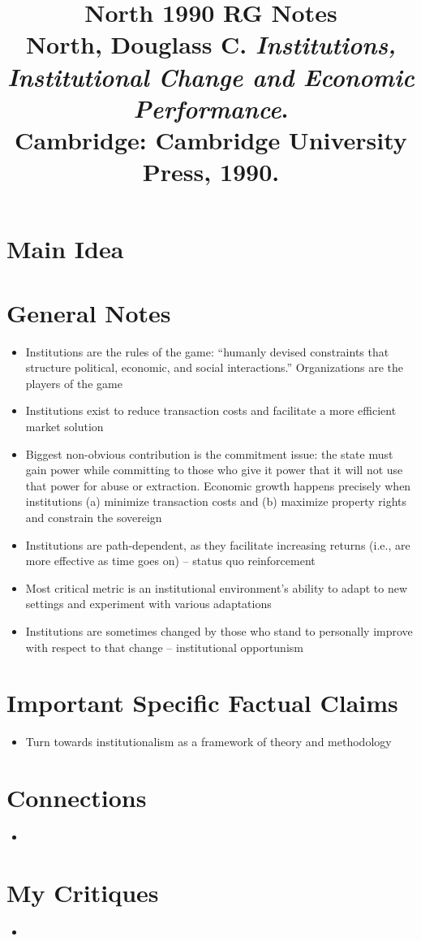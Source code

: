 \documentclass[12pt]{article}
\title{\textbf{North 1990 RG Notes}\\
\large North, Douglass C. \textit{Institutions, Institutional Change and Economic Performance}.\\
Cambridge: Cambridge University Press, 1990.}
\author{}
\date{}
\begin{document}
\maketitle

\section{Main Idea}



\section{General Notes}

\begin{itemize}[leftmargin=*, itemsep=4pt]
    \item Institutions are the rules of the game: ``humanly devised constraints that structure political, economic, and social interactions.'' Organizations are the players of the game
    \item Institutions exist to reduce transaction costs and facilitate a more efficient market solution
    \item Biggest non-obvious contribution is the commitment issue: the state must gain power while committing to those who give it power that it will not use that power for abuse or extraction. Economic growth happens precisely when institutions (a) minimize transaction costs and (b) maximize property rights and constrain the sovereign
    \item Institutions are path-dependent, as they facilitate increasing returns (i.e., are more effective as time goes on) -- status quo reinforcement
    \item Most critical metric is an institutional environment's ability to adapt to new settings and experiment with various adaptations
    \item Institutions are sometimes changed by those who stand to personally improve with respect to that change -- institutional opportunism
\end{itemize}


\section{Important Specific Factual Claims}

\begin{itemize}[leftmargin=*, itemsep=4pt]
    \item Turn towards institutionalism as a framework of theory and methodology
\end{itemize}


\section{Connections}

\begin{itemize}
    \item
\end{itemize}


\section{My Critiques}

\begin{itemize}
    \item
\end{itemize}
\end{document}
